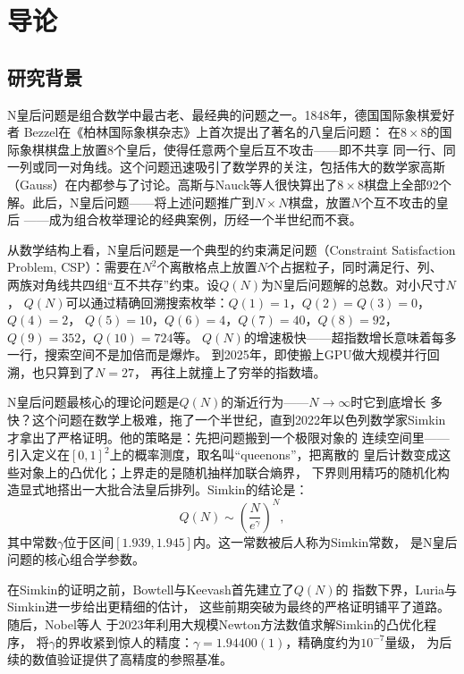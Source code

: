 \chapter{导论}

\section{研究背景}

N皇后问题是组合数学中最古老、最经典的问题之一。1848年，德国国际象棋爱好者
Bezzel在《柏林国际象棋杂志》上首次提出了著名的八皇后问题\cite{Bezzel1848}：
在$8\times8$的国际象棋棋盘上放置8个皇后，使得任意两个皇后互不攻击——即不共享
同一行、同一列或同一对角线。这个问题迅速吸引了数学界的关注，包括伟大的数学家高斯
（Gauss）在内都参与了讨论。高斯与Nauck等人很快算出了$8\times8$棋盘上全部92个
解。此后，N皇后问题——将上述问题推广到$N\times N$棋盘，放置$N$个互不攻击的皇后
——成为组合枚举理论的经典案例，历经一个半世纪而不衰。

从数学结构上看，N皇后问题是一个典型的约束满足问题（Constraint Satisfaction
Problem, CSP）：需要在$N^{2}$个离散格点上放置$N$个占据粒子，同时满足行、列、
两族对角线共四组``互不共存''约束。设$Q(N)$为N皇后问题解的总数。对小尺寸$N$，
$Q(N)$可以通过精确回溯搜索枚举：$Q(1)=1$，$Q(2)=Q(3)=0$，$Q(4)=2$，
$Q(5)=10$，$Q(6)=4$，$Q(7)=40$，$Q(8)=92$，$Q(9)=352$，$Q(10)=724$等。
$Q(N)$的增速极快——超指数增长意味着每多一行，搜索空间不是加倍而是爆炸。
到2025年，即使搬上GPU做大规模并行回溯，也只算到了$N=27$\cite{Yao2025}，
再往上就撞上了穷举的指数墙。

N皇后问题最核心的理论问题是$Q(N)$的渐近行为——$N\to\infty$时它到底增长
多快？这个问题在数学上极难，拖了一个半世纪，直到2022年以色列数学家Simkin
才拿出了严格证明\cite{Simkin2022}。他的策略是：先把问题搬到一个极限对象的
连续空间里——引入定义在$[0,1]^2$上的概率测度，取名叫``queenons''，把离散的
皇后计数变成这些对象上的凸优化；上界走的是随机抽样加联合熵界，
下界则用精巧的随机化构造显式地搭出一大批合法皇后排列。Simkin的结论是：
%
\begin{equation}
  Q(N)\sim \left(\frac{N}{e^{\gamma}}\right)^{N},
  \label{eq:QN}
\end{equation}
%
其中常数$\gamma$位于区间$[1.939,1.945]$内。这一常数被后人称为Simkin常数，
是N皇后问题的核心组合学参数。

在Simkin的证明之前，Bowtell与Keevash\cite{Bowtell2023}首先建立了$Q(N)$的
指数下界，Luria与Simkin\cite{Luria2021}进一步给出更精细的估计，
这些前期突破为最终的严格证明铺平了道路。随后，Nobel等人\cite{Nobel2023}
于2023年利用大规模Newton方法数值求解Simkin的凸优化程序，
将$\gamma$的界收紧到惊人的精度：$\gamma=1.94400(1)$，精确度约为$10^{-7}$量级，
为后续的数值验证提供了高精度的参照基准。

